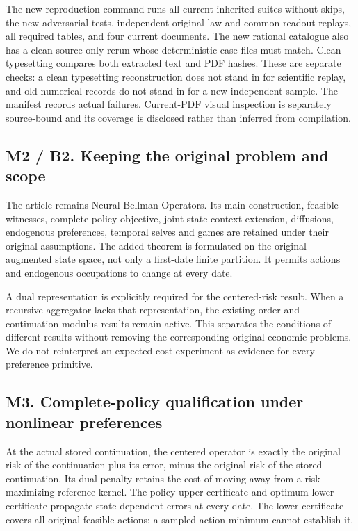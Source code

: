 The new reproduction command runs all current inherited suites without
skips, the new adversarial tests, independent original-law and
common-readout replays, all required tables, and four current documents.
The new rational catalogue also has a clean source-only rerun whose
deterministic case files must match. Clean typesetting compares both
extracted text and PDF hashes. These are separate checks: a clean
typesetting reconstruction does not stand in for scientific replay, and
old numerical records do not stand in for a new independent sample. The
manifest records actual failures. Current-PDF visual inspection is
separately source-bound and its coverage is disclosed rather than
inferred from compilation.

\hypertarget{m2-b2.-keeping-the-original-problem-and-scope}{%
\subsection{M2 / B2. Keeping the original problem and
scope}\label{m2-b2.-keeping-the-original-problem-and-scope}}

The article remains Neural Bellman Operators. Its main construction,
feasible witnesses, complete-policy objective, joint state-context
extension, diffusions, endogenous preferences, temporal selves and games
are retained under their original assumptions. The added theorem is
formulated on the original augmented state space, not only a first-date
finite partition. It permits actions and endogenous occupations to
change at every date.

A dual representation is explicitly required for the centered-risk
result. When a recursive aggregator lacks that representation, the
existing order and continuation-modulus results remain active. This
separates the conditions of different results without removing the
corresponding original economic problems. We do not reinterpret an
expected-cost experiment as evidence for every preference primitive.

\hypertarget{m3.-complete-policy-qualification-under-nonlinear-preferences}{%
\subsection{M3. Complete-policy qualification under nonlinear
preferences}\label{m3.-complete-policy-qualification-under-nonlinear-preferences}}

At the actual stored continuation, the centered operator is exactly the
original risk of the continuation plus its error, minus the original
risk of the stored continuation. Its dual penalty retains the cost of
moving away from a risk-maximizing reference kernel. The policy upper
certificate and optimum lower certificate propagate state-dependent
errors at every date. The lower certificate covers all original feasible
actions; a sampled-action minimum cannot establish it.

